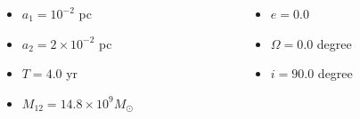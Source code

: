 \documentclass[hyperref={pdfpagelabels=false}]{beamer}
\begin{document}
\begin{frame}
  \begin{columns}
  \centering
    \begin{column}{0.5\textwidth}
      \begin{itemize}
        \item $a_{1} = 10^{-2}$ pc
        \item $a_{2} = 2 \times 10^{-2}$ pc
        \item $T = 4.0$ yr
        \item $M_{12} = 14.8 \times 10^{9} M_{\odot}$
      \end{itemize}
    \end{column}
    \begin{column}{0.5\textwidth}
      \begin{itemize}
        \item $e = 0.0$
        \item $\Omega = 0.0$ degree
        \item $i = 90.0$ degree
      \end{itemize}
    \end{column}
  \end{columns}
\end{frame}
\end{document}
